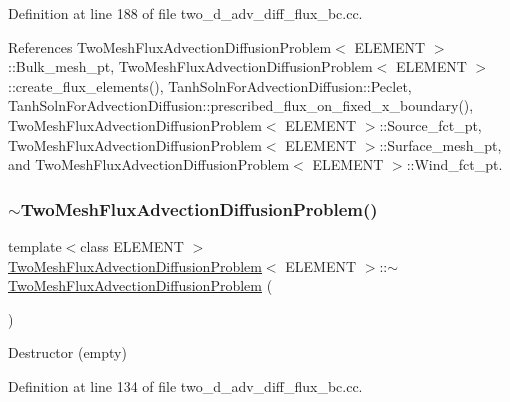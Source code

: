 Definition at line 188 of file two\+\_\+d\+\_\+adv\+\_\+diff\+\_\+flux\+\_\+bc.\+cc.



References Two\+Mesh\+Flux\+Advection\+Diffusion\+Problem$<$ E\+L\+E\+M\+E\+N\+T $>$\+::\+Bulk\+\_\+mesh\+\_\+pt, Two\+Mesh\+Flux\+Advection\+Diffusion\+Problem$<$ E\+L\+E\+M\+E\+N\+T $>$\+::create\+\_\+flux\+\_\+elements(), Tanh\+Soln\+For\+Advection\+Diffusion\+::\+Peclet, Tanh\+Soln\+For\+Advection\+Diffusion\+::prescribed\+\_\+flux\+\_\+on\+\_\+fixed\+\_\+x\+\_\+boundary(), Two\+Mesh\+Flux\+Advection\+Diffusion\+Problem$<$ E\+L\+E\+M\+E\+N\+T $>$\+::\+Source\+\_\+fct\+\_\+pt, Two\+Mesh\+Flux\+Advection\+Diffusion\+Problem$<$ E\+L\+E\+M\+E\+N\+T $>$\+::\+Surface\+\_\+mesh\+\_\+pt, and Two\+Mesh\+Flux\+Advection\+Diffusion\+Problem$<$ E\+L\+E\+M\+E\+N\+T $>$\+::\+Wind\+\_\+fct\+\_\+pt.

\mbox{\label{classTwoMeshFluxAdvectionDiffusionProblem_a65445b9eb9c01680d8137d1fdba05626}} 
\subsubsection{\texorpdfstring{$\sim$\+Two\+Mesh\+Flux\+Advection\+Diffusion\+Problem()}{~TwoMeshFluxAdvectionDiffusionProblem()}}
{\footnotesize\ttfamily template$<$class E\+L\+E\+M\+E\+NT $>$ \\
\hyperlink{classTwoMeshFluxAdvectionDiffusionProblem}{Two\+Mesh\+Flux\+Advection\+Diffusion\+Problem}$<$ E\+L\+E\+M\+E\+NT $>$\+::$\sim$\hyperlink{classTwoMeshFluxAdvectionDiffusionProblem}{Two\+Mesh\+Flux\+Advection\+Diffusion\+Problem} (\begin{DoxyParamCaption}{ }\end{DoxyParamCaption})\hspace{0.3cm}{\ttfamily [inline]}}



Destructor (empty) 



Definition at line 134 of file two\+\_\+d\+\_\+adv\+\_\+diff\+\_\+flux\+\_\+bc.\+cc.



